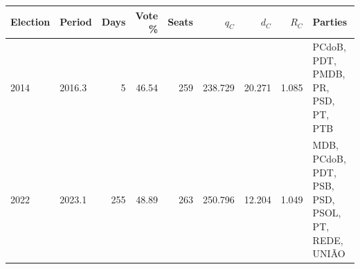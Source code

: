 \begin{tabularx}{\textwidth}{@{}llrrrrrr>{\raggedright\arraybackslash}X@{}}
\toprule
Election & Period & Days & Vote \% & Seats & \(q_C\) & \(d_C\) & \(R_C\) & Parties \\
\midrule
2014 & 2016.3 & 5 & 46.54 & 259 & 238.729 & 20.271 & 1.085 & PCdoB, PDT, PMDB, PR, PSD, PT, PTB \\
2022 & 2023.1 & 255 & 48.89 & 263 & 250.796 & 12.204 & 1.049 & MDB, PCdoB, PDT, PSB, PSD, PSOL, PT, REDE, UNIÃO \\
\bottomrule
\end{tabularx}
\par{}
